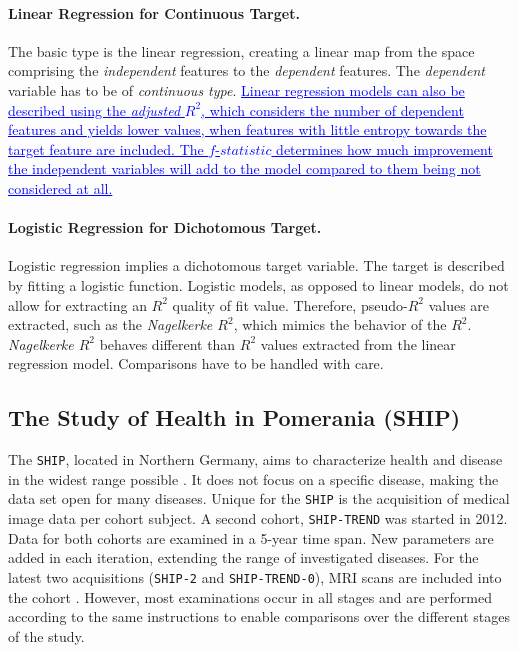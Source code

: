 \documentclass[journal]{style/vgtc} 			          %
\newcommand{\add}[1]{\textcolor{blue}{\uline{#1}}}
\begin{document}
\paragraph{Linear Regression for Continuous Target.} The basic type is the linear regression, creating a linear map from the space comprising the \emph{independent} features to the \emph{dependent} features.
The \emph{dependent} variable has to be of \emph{continuous type}.
\add{
Linear regression models can also be described using the \emph{adjusted} $R^2$, which considers the number of dependent features and yields lower values, when features with little entropy towards the target feature are included.
The $f$-$statistic$ determines how much improvement the independent variables will add to the model compared to them being not considered at all.
}

\paragraph{Logistic Regression for Dichotomous Target.} Logistic regression implies a dichotomous target variable.
The target is described by fitting a logistic function.
Logistic models, as opposed to linear models, do not allow for extracting an $R^2$ quality of fit value.
Therefore, pseudo-$R^2$ values are extracted, such as the \emph{Nagelkerke $R^2$}, which mimics the behavior of the $R^2$.
\emph{Nagelkerke $R^2$} behaves different than $R^2$ values extracted from the linear regression model.
Comparisons have to be handled with care.
\subsection{The Study of Health in Pomerania (SHIP)}
The \texttt{SHIP}, located in Northern Germany, aims to characterize health and disease in the widest range possible \cite{Volzke2011}.
It does not focus on a specific disease, making the data set open for many diseases.
Unique for the \texttt{SHIP} is the acquisition of medical image data per cohort subject.
A second cohort, \texttt{SHIP-TREND} was started in 2012.
Data for both cohorts are examined in a 5-year time span.
New parameters are added in each iteration, extending the range of investigated diseases.
For the latest two acquisitions (\texttt{SHIP-2} and \texttt{SHIP-TREND-0}), MRI scans are included into the cohort \cite{Hegenscheid2009, Ivanovska2014}.
However, most examinations occur in all stages and are performed according to the same instructions to enable comparisons over the different stages of the study.
\end{document}
